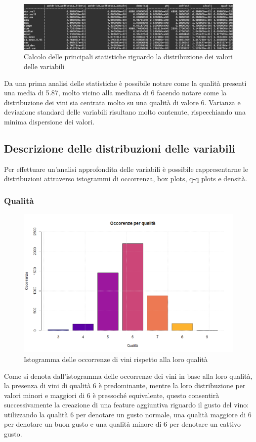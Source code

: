 \documentclass[12pt]{article}
\begin{document}
\begin{figure}[!htb]
    \centering
    \includegraphics[width=1\textwidth]{immagini/sum1.png}
    \caption{Calcolo delle principali statistiche riguardo la distribuzione dei valori delle variabili}
\end{figure}
\FloatBarrier
Da una prima analisi delle statistiche è possibile notare come la qualità presenti una media di 5.87, molto vicino alla mediana di 6 facendo notare come la distribuzione dei vini sia centrata molto su una qualità di valore 6. Varianza e deviazione standard delle variabili risultano molto contenute, rispecchiando una minima dispersione dei valori.
\newpage
\subsection{Descrizione delle distribuzioni delle variabili}
Per effettuare un'analisi approfondita delle variabili è possibile rappresentarne le distribuzioni attraverso istogrammi di occorrenza, box plots, q-q plots e densità.
\subsubsection{Qualità}
\begin{figure}[!htb]
    \centering
    \includegraphics[width=1\textwidth]{immagini/qua.png}
    \caption{Istogramma delle occorrenze di vini rispetto alla loro qualità}
\end{figure}
\FloatBarrier
Come si denota dall'istogramma delle occorrenze dei vini in base alla loro qualità, la presenza di vini di qualità 6 è predominante, mentre la loro distribuzione per valori minori e maggiori di 6 è pressoché equivalente, questo consentirà successivamente la creazione di una feature aggiuntiva riguardo il gusto del vino: utilizzando la qualità 6 per denotare un gusto normale, una qualità maggiore di 6 per denotare un buon gusto e una qualità minore di 6 per denotare un cattivo gusto.
\newpage
\end{document}

